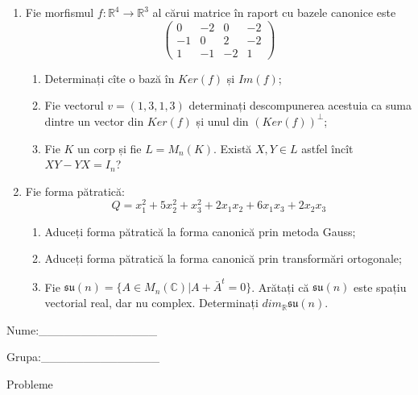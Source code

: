 \documentclass{article}
\begin{document}
\begin{enumerate}
 \item Fie morfismul $f:\mathbb{R}^4 \to \mathbb{R}^3$ al cărui matrice în raport cu bazele canonice este
$$\begin{pmatrix}
0&-2&0&-2\\
-1&0&2&-2\\
1&-1&-2&1
\end{pmatrix}$$

\begin{enumerate}
\item Determinați cîte o bază în $Ker(f)$ și $Im(f)$;
\item Fie vectorul $v=(1,3,1,3)$ determinați descompunerea acestuia ca suma dintre un vector din $Ker(f)$ și unul din $(Ker(f))^\perp$;
\item Fie $K$ un corp și fie $L=M_n(K)$. Există $X,Y \in L$ astfel încît $XY-YX=I_n$?  
\end{enumerate}
\item Fie forma pătratică:
$$Q= x_1^2+5x_2^2+x_3^2+2x_1x_2+6x_1x_3+2x_2x_3$$

\begin{enumerate}
\item Aduceți forma pătratică la forma canonică prin metoda Gauss;
\item Aduceți forma pătratică la forma canonică prin transformări ortogonale;
\item Fie $\mathfrak{su}(n)=\{ A \in M_n(\mathbb{C}) | A+\bar{A}^t=0\}$. Arătați că $\mathfrak{su}(n)$ este spațiu vectorial real, dar nu complex.
Determinați $dim_{\mathbb{R}}\mathfrak{su}(n)$.
\end{enumerate}
\end{enumerate}
\newpage
\begin{flushright}
Nume:\_\_\_\_\_\_\_\_\_\_\_\_\_\_
 
 
Grupa:\_\_\_\_\_\_\_\_\_\_\_\_\_\_
\end{flushright}
\begin{center}
\vspace{2cm}
{\Large Probleme}
\vspace{2cm}
\end{center}
\end{document}
